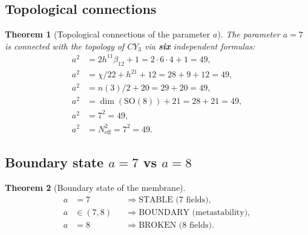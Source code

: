 \documentclass[11pt,a4paper]{article}
\newcommand{\SO}{\mathrm{SO}}
\newcommand{\CY}{CY_3}
\newtheorem{theorem}{Theorem}[section]
\theoremstyle{definition}
\begin{document}
\subsection{Topological connections}

\begin{theorem}[Topological connections of the parameter $a$]
\label{thm:membrane-topology-review}
The parameter $a = 7$ is connected with the topology of $\CY$ via 
\textbf{six} independent formulas:
\begin{align}
    a^2 &= 2 h^{11} \beta_{12} + 1 = 2 \cdot 6 \cdot 4 + 1 = 49, \\
    a^2 &= \chi/22 + h^{21} + 12 = 28 + 9 + 12 = 49, \\
    a^2 &= n(3)/2 + 20 = 29 + 20 = 49, \\
    a^2 &= \dim(\SO(8)) + 21 = 28 + 21 = 49, \\
    a^2 &= 7^2 = 49, \\
    a^2 &= N_{\text{eff}}^2 = 7^2 = 49.
\end{align}
\end{theorem}

\subsection{Boundary state $a = 7$ vs $a = 8$}

\begin{theorem}[Boundary state of the membrane]
\label{thm:membrane-boundary-review}
\begin{equation}
    \boxed{
    \begin{aligned}
        a &= 7 &&\Rightarrow \text{STABLE (7 fields)}, \\
        a &\in (7, 8) &&\Rightarrow \text{BOUNDARY (metastability)}, \\
        a &= 8 &&\Rightarrow \text{BROKEN (8 fields)}.
    \end{aligned}}
    \label{eq:membrane-boundary-review}
\end{equation}
\end{theorem}
\end{document}
